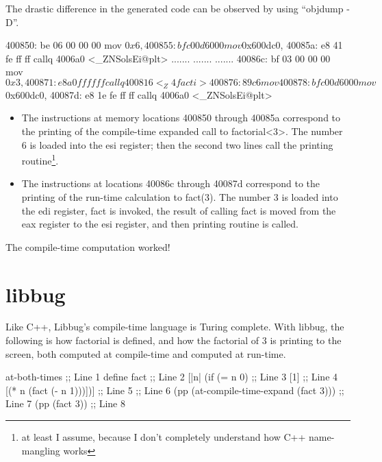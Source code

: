  The drastic difference in the generated code can be observed by using ``objdump -D''.

 \begin{examplecode}
 400850: be 06 00 00 00   mov    $0x6,%
 400855: bf c0 0d 60 00   mov    $0x600dc0,%
 40085a: e8 41 fe ff ff   callq  4006a0 <_ZNSolsEi@plt>
 .......
 .......
 .......
 40086c: bf 03 00 00 00   mov    $0x3,%
 400871: e8 a0 ff ff ff   callq  400816 <_Z4facti>
 400876: 89 c6            mov    %
 400878: bf c0 0d 60 00   mov    $0x600dc0,%
 40087d: e8 1e fe ff ff   callq  4006a0 <_ZNSolsEi@plt>
 \end{examplecode}

 \begin{itemize}
   \item
 The instructions at memory locations 400850 through 40085a correspond to the
 printing of the compile-time expanded call to factorial\textless3\textgreater.
 The number 6 is loaded into the esi register; then the second
 two lines call the printing routine\footnote{at least I assume, because
 I don't completely understand how C++ name-mangling works}.
   \item
 The instructions at locations 40086c through 40087d correspond to the
 printing of the run-time calculation to fact(3).  The number 3
 is loaded into the edi register, fact is invoked, the result of
 calling fact is moved from the eax register to the esi register, and then
 printing routine is called.

 \end{itemize}
 The compile-time computation worked!

 \section{libbug}
 Like C++, Libbug's compile-time language is Turing complete.
 With libbug, the following is how factorial is defined, and how
 the factorial of 3 is printing to the screen, both computed at
 compile-time and computed at run-time.

 \begin{examplecode}
 {at-both-times                           ;; Line 1
  {define fact                            ;; Line 2
    [|n| (if (= n 0)                      ;; Line 3
             [1]                          ;; Line 4
             [(* n (fact (- n 1)))])]}}   ;; Line 5
                                          ;; Line 6
 (pp (at-compile-time-expand (fact 3)))   ;; Line 7
 (pp (fact 3))                            ;; Line 8
 \end{examplecode}

